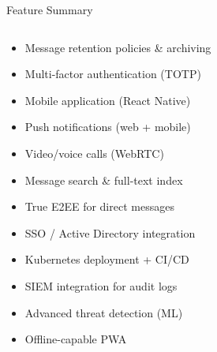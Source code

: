 \documentclass[aspectratio=169,12pt]{beamer}
\begin{document}
\begin{frame}{Feature Summary}
\begin{columns}[t]
\begin{tcolorbox}[colback=SlideGray,colframe=AccentBlue,arc=5pt,
  left=4pt,right=4pt,top=4pt,bottom=4pt]
\small
\begin{itemize}\setlength\itemsep{4pt}
  \item[\faClock] Message retention policies \& archiving
  \item[\faClock] Multi-factor authentication (TOTP)
  \item[\faClock] Mobile application (React Native)
  \item[\faClock] Push notifications (web + mobile)
  \item[\faClock] Video/voice calls (WebRTC)
  \item[\faClock] Message search \& full-text index
  \item[\faClock] True E2EE for direct messages
  \item[\faClock] SSO / Active Directory integration
  \item[\faClock] Kubernetes deployment + CI/CD
  \item[\faClock] SIEM integration for audit logs
  \item[\faClock] Advanced threat detection (ML)
  \item[\faClock] Offline-capable PWA
\end{itemize}
\end{tcolorbox}
\end{columns}
\end{frame}
\end{document}
